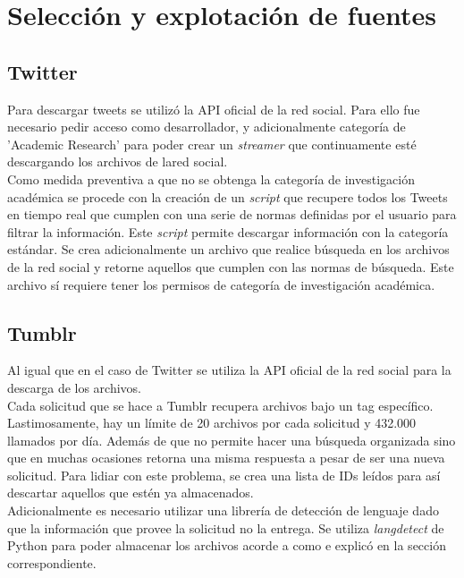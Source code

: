 \section{Selección y explotación de fuentes}

\subsection{Twitter}
Para descargar tweets se utilizó la API oficial de la red social. Para ello fue necesario pedir acceso como desarrollador, y adicionalmente categoría de 'Academic Research' para poder crear un \textit{streamer} que continuamente esté descargando los archivos de lared social.\\ 

Como medida preventiva a que no se obtenga la categoría de investigación académica se procede con la creación de un \textit{script} que recupere todos los Tweets en tiempo real que cumplen con una serie de normas definidas por el usuario para filtrar la información. Este \textit{script} permite descargar información con la categoría estándar. Se crea adicionalmente un archivo que realice búsqueda en los archivos de la red social y retorne aquellos que cumplen con las normas de búsqueda. Este archivo sí requiere tener los permisos de categoría de investigación académica.

\subsection{Tumblr}
Al igual que en el caso de Twitter se utiliza la API oficial de la red social para la descarga de los archivos.\\

Cada solicitud que se hace a Tumblr recupera archivos bajo un tag específico. Lastimosamente, hay un límite de 20 archivos por cada solicitud y 432.000 llamados por día. Además de que no permite hacer una búsqueda organizada sino que en muchas ocasiones retorna una misma respuesta a pesar de ser una nueva solicitud. Para lidiar con este problema, se crea una lista de IDs leídos para así descartar aquellos que estén ya almacenados.\\ 

Adicionalmente es necesario utilizar una librería de detección de lenguaje dado que la información que provee la solicitud no la entrega. Se utiliza \textit{langdetect} de Python para poder almacenar los archivos acorde a como e explicó en la sección correspondiente.

